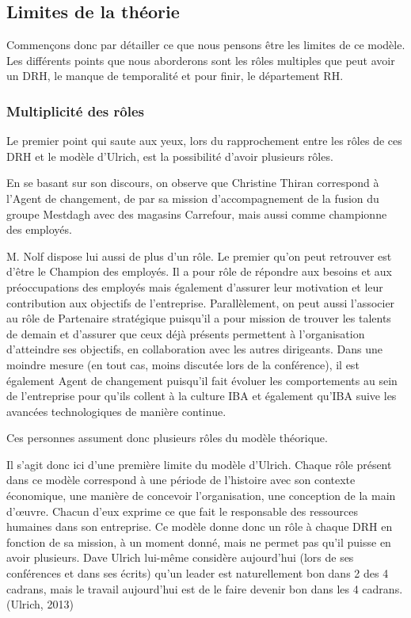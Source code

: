 \subsection{Limites de la théorie}

Commençons donc par détailler ce que nous pensons être les limites de ce modèle. Les différents points que nous aborderons sont les rôles multiples que peut avoir un DRH, le manque de temporalité et pour finir, le département RH.\

\subsubsection*{Multiplicité des rôles} 

Le premier point qui saute aux yeux, lors du rapprochement entre les rôles de ces DRH et le modèle d'Ulrich, est la possibilité d'avoir plusieurs rôles. \newline

En se basant sur son discours, on observe que Christine Thiran correspond à l'\og{}Agent de changement\fg{}, de par sa mission d'accompagnement de la fusion du groupe Mestdagh avec des magasins Carrefour, mais aussi comme \og{}championne des employés\fg{}. \newline

M. Nolf dispose lui aussi de plus d'un rôle. Le premier qu'on peut retrouver est d'être le \og{}Champion des employés\fg{}. Il a pour rôle de répondre aux besoins et aux préoccupations des employés mais également d'assurer leur motivation et leur contribution aux objectifs de l'entreprise. Parallèlement, on peut aussi l'associer au rôle de \og{}Partenaire stratégique \fg{} puisqu'il a pour mission de trouver les talents de demain et d'assurer que ceux déjà présents permettent à l'organisation d'atteindre ses objectifs, en collaboration avec les autres dirigeants. Dans une moindre mesure (en tout cas, moins discutée lors de la conférence), il est également \og{}Agent de changement\fg{} puisqu'il fait évoluer les comportements au sein de l'entreprise pour qu'ils collent à la culture IBA et également qu'IBA suive les avancées technologiques de manière continue. 

Ces personnes assument donc plusieurs rôles du modèle théorique. \newline

Il s'agit donc ici d'une première limite du modèle d'Ulrich. Chaque rôle présent dans ce modèle correspond à une période de l'histoire avec son contexte économique, une manière de concevoir l'organisation, une conception de la main d'\oe{}uvre. Chacun d'eux exprime ce que fait le responsable des ressources humaines dans son entreprise. Ce modèle donne donc un rôle à chaque DRH en fonction de sa mission, à un moment donné, mais ne permet pas qu'il puisse en avoir plusieurs. Dave Ulrich lui-même considère aujourd'hui (lors de ses conférences et dans ses écrits) qu'un leader est naturellement bon dans 2 des 4 cadrans, mais le travail aujourd'hui est de le faire devenir bon dans les 4 cadrans. (Ulrich, 2013)\newline 

